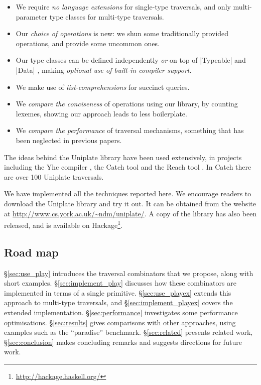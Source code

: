 \begin{itemize}
\item We require \textit{no language extensions} for single-type traversals, and only multi-parameter type classes \citep{jones:mptc} for multi-type traversals.
\item Our \textit{choice of operations} is new: we shun some traditionally provided operations, and provide some uncommon ones.
\item Our type classes can be defined independently \textit{or} on top of |Typeable| and |Data| \citep{lammel:syb}, making \textit{optional use of built-in compiler support}.
\item We make use of \textit{list-comprehensions} \citep{wadler:list_comprehensions} for succinct queries.
\item We \textit{compare the conciseness} of operations using our library, by counting lexemes, showing our approach leads to less boilerplate.
\item We \textit{compare the performance} of traversal mechanisms, something that has been neglected in previous papers.
\end{itemize}

The ideas behind the Uniplate library have been used extensively, in projects including the Yhc compiler \citep{me:yhc_core}, the Catch tool \citep{me:catch_tfp} and the Reach tool \cite{naylor:reach}. In Catch there are over 100 Uniplate traversals.

We have implemented all the techniques reported here. We encourage readers to download the Uniplate library and try it out. It can be obtained from the website at \url{http://www.cs.york.ac.uk/~ndm/uniplate/}. A copy of the library has also been released, and is available on Hackage\footnote{\url{http://hackage.haskell.org/}}.

\subsection{Road map}

\S\ref{sec:use_play} introduces the traversal combinators that we propose, along with short examples. \S\ref{sec:implement_play} discusses how these combinators are implemented in terms of a single primitive. \S\ref{sec:use_playex} extends this approach to multi-type traversals, and \S\ref{sec:implement_playex} covers the extended implementation. \S\ref{sec:performance} investigates some performance optimisations. \S\ref{sec:results} gives comparisons with other approaches, using examples such as the ``paradise'' benchmark. \S\ref{sec:related} presents related work, \S\ref{sec:conclusion} makes concluding remarks and suggests directions for future work.


